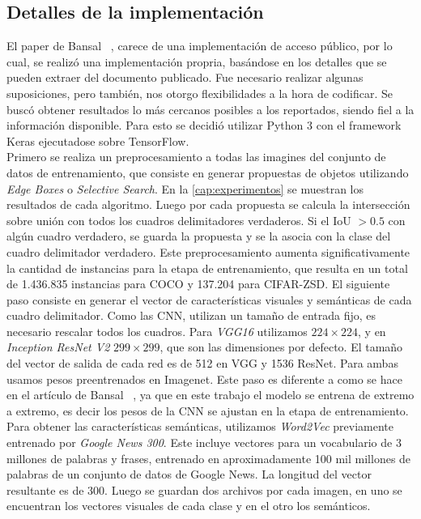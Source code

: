 \subsection{Detalles de la implementación} \label{ssec:detallesdelaimplementacion}

El paper de Bansal \etal~\cite{bansal2018zero}, carece de una implementación de acceso público, por lo cual, se realizó una implementación propria, basándose en los detalles que se pueden extraer del documento publicado. Fue necesario realizar algunas suposiciones, pero también, nos otorgo flexibilidades a la hora de codificar. Se buscó obtener resultados lo más cercanos posibles a los reportados, siendo fiel a la información disponible. Para esto se decidió utilizar Python 3 con el framework Keras ejecutadose sobre TensorFlow.\\

Primero se realiza un preprocesamiento a todas las imagines del conjunto de datos de entrenamiento, que consiste en generar propuestas de objetos utilizando \textit{Edge Boxes} o \textit{Selective Search}. En la \autoref{cap:experimentos} se muestran los resultados de cada algoritmo. Luego por cada propuesta se calcula la intersección sobre unión con todos los cuadros delimitadores verdaderos. Si el IoU $> 0.5$ con algún cuadro verdadero, se guarda la propuesta y se la asocia con la clase del cuadro delimitador verdadero. Este preprocesamiento aumenta significativamente la cantidad de instancias para la etapa de entrenamiento, que resulta en un total de 1.436.835 instancias para COCO y 137.204 para CIFAR-ZSD. El siguiente paso consiste en generar el vector de características visuales y semánticas de cada cuadro delimitador. Como las CNN, utilizan un tamaño de entrada fijo, es necesario rescalar todos los cuadros.  Para \textit{VGG16} utilizamos $224 \times 224$, y en \textit{Inception ResNet V2} $299 \times 299$, que son las dimensiones por defecto. El tamaño del vector de salida de cada red es de 512 en VGG y 1536 ResNet. Para ambas usamos pesos preentrenados en Imagenet. Este paso es diferente a como se hace en el artículo de Bansal \etal~\cite{bansal2018zero}, ya que en este trabajo el modelo se entrena de extremo a extremo, es decir los pesos de la CNN se ajustan en la etapa de entrenamiento. Para obtener las características semánticas, utilizamos \textit{Word2Vec} previamente entrenado por \textit{Google News 300}. Este incluye vectores para un vocabulario de 3 millones de palabras y frases, entrenado en aproximadamente 100 mil millones de palabras de un conjunto de datos de Google News. La longitud del vector resultante es de 300. Luego se guardan dos archivos por cada imagen, en uno se encuentran los vectores visuales de cada clase y en el otro los semánticos.\\

